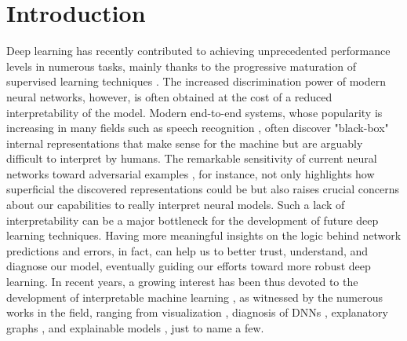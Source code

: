\documentclass{article}
\begin{document}
\section{Introduction}
Deep learning has recently contributed to achieving unprecedented performance levels in numerous tasks, mainly thanks to the progressive maturation of supervised learning techniques \cite{Goodfellow-et-al-2016-Book}. 
The increased discrimination power of modern neural networks, however, is often obtained  at  the  cost of  a reduced interpretability  of the model. Modern end-to-end systems, whose popularity is increasing in many fields such as speech recognition \cite{lideng,attention_asr,graves_ctc}, often discover "black-box" internal representations that make sense for the machine but are arguably difficult to interpret by humans.
The remarkable sensitivity of current neural networks toward adversarial examples \cite{adversarial}, for instance, not only highlights how superficial the discovered representations could be but also raises crucial concerns about our capabilities to really interpret neural models.
Such a lack of interpretability can be a major bottleneck for the development of future deep learning techniques. Having more meaningful insights on the logic behind network predictions and errors, in fact, can help us to better trust, understand, and diagnose our model, eventually guiding our efforts toward more robust deep learning. 
In recent years, a growing interest has been thus devoted to the development of interpretable machine learning \cite{book_interp,int_summary}, as witnessed by the numerous works in the field, ranging from visualization \cite{understand_cnn,int_visual}, diagnosis of DNNs  \cite{lime}, explanatory graphs \cite{exp_graph}, and explainable models \cite{capsule}, just to name a few.
\end{document}
